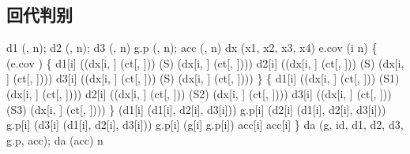 \subsection{回代判别}
\begin{code}
d1 \ROperator{<-} (, n); d2 \ROperator{<-} (, n); d3 \ROperator{<-} (, n)
g.p \ROperator{<-} (, n); acc \ROperator{<-} (, n)
dx \ROperator{<-} (x1, x2, x3, x4)
e.cov \ROperator{<-}                        
 (i  \ROperator{:}n) \{
   (e.cov \ROperator{==} ) \{
    d1[i] \ROperator{<-} ((dx[i, ] \ROperator{-} (ct[, ])) \ROperator{\%*\%} (S) \ROperator{\%*\%}
                  (dx[i, ] \ROperator{-} (ct[, ])))
    d2[i] \ROperator{<-} ((dx[i, ] \ROperator{-} (ct[, ])) \ROperator{\%*\%} (S) \ROperator{\%*\%}
                  (dx[i, ] \ROperator{-} (ct[, ])))
    d3[i] \ROperator{<-} ((dx[i, ] \ROperator{-} (ct[, ])) \ROperator{\%*\%} (S) \ROperator{\%*\%}
                  (dx[i, ] \ROperator{-} (ct[, ])))
  \}  \{
    d1[i] \ROperator{<-} ((dx[i, ] \ROperator{-} (ct[, ])) \ROperator{\%*\%} (S1) \ROperator{\%*\%}
                  (dx[i, ] \ROperator{-} (ct[, ])))
    d2[i] \ROperator{<-} ((dx[i, ] \ROperator{-} (ct[, ])) \ROperator{\%*\%} (S2) \ROperator{\%*\%}
                  (dx[i, ] \ROperator{-} (ct[, ])))
    d3[i] \ROperator{<-} ((dx[i, ] \ROperator{-} (ct[, ])) \ROperator{\%*\%} (S3) \ROperator{\%*\%}
                  (dx[i, ] \ROperator{-} (ct[, ])))
  \}
   (d1[i] \ROperator{==} (d1[i], d2[i], d3[i])) g.p[i] \ROperator{<-} 
   (d2[i] \ROperator{==} (d1[i], d2[i], d3[i])) g.p[i] \ROperator{<-} 
   (d3[i] \ROperator{==} (d1[i], d2[i], d3[i])) g.p[i] \ROperator{<-} 
   (g[i] \ROperator{==} g.p[i]) acc[i] \ROperator{<-}   acc[i] \ROperator{<-} 
\}
da \ROperator{<-} (g, id, d1, d2, d3, g.p, acc); da
(acc) \ROperator{/} n
\end{code}
